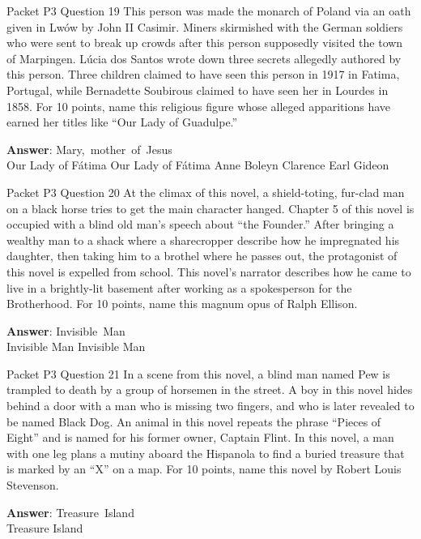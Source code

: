 \begin{frame}{Packet P3 Question 19}
This person was made the monarch of Poland via an oath given in Lwów by John II Casimir. Miners skirmished with the German soldiers who were sent to break up crowds after this person supposedly visited the town of Marpingen. Lúcia dos Santos wrote down three secrets allegedly authored by this person.   Three children claimed to have seen this person in 1917 in Fatima, Portugal, while Bernadette Soubirous claimed to have seen her in Lourdes in 1858. For 10 points, name this religious figure whose alleged apparitions have earned her titles like “Our Lady of Guadulpe.”      

\textbf{Answer}: Mary,\ mother\ of\ Jesus\\
 Our Lady of Fátima
 Our Lady of Fátima
 Anne Boleyn
 Clarence Earl Gideon
\end{frame}

\begin{frame}{Packet P3 Question 20}
At the climax of this novel, a shield-toting, fur-clad man on a black horse tries to get the main character hanged. Chapter 5 of this novel is occupied with a blind old man’s speech about “the Founder.” After bringing a wealthy man to a shack where a sharecropper describe how he impregnated his daughter, then taking him   to a brothel where he passes out, the protagonist of this novel is expelled from school. This novel’s narrator describes how he came to live in a brightly-lit basement after working as a spokesperson for the Brotherhood.   For 10 points, name this magnum opus of Ralph Ellison.    

\textbf{Answer}: Invisible\ Man\\
 Invisible Man
 Invisible Man
\end{frame}

\begin{frame}{Packet P3 Question 21}
In a scene from this novel, a blind man named   Pew is trampled     to death by a group of horsemen in the street. A boy in this novel hides behind a door with a man who is missing two fingers, and who is later revealed to be named Black Dog. An animal in this novel repeats the phrase ``Pieces of Eight'' and is named for his former owner, Captain Flint. In this novel, a man with one leg plans a mutiny aboard the Hispanola to find a buried treasure that is marked by an ``X'' on a map. For 10 points, name this novel by Robert Louis Stevenson.  

\textbf{Answer}: Treasure\ Island\\
 Treasure Island
\end{frame}

